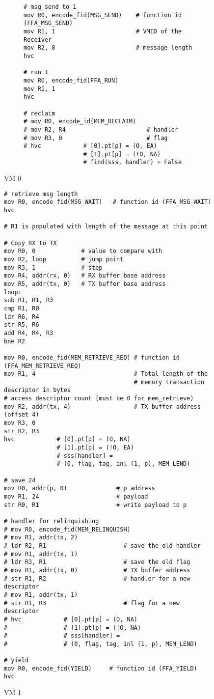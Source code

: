 \documentclass{book}
\begin{document}
\begin{figure}[hbt!]
\begin{subfigure}{.5\textwidth}
\begin{lstlisting}
# msg_send to 1
mov R0, encode_fid(MSG_SEND)    # function id (FFA_MSG_SEND)
mov R1, 1                       # VMID of the Receiver
mov R2, 8                       # message length
hvc

# run 1
mov R0, encode_fid(FFA_RUN)
mov R1, 1
hvc

# reclaim
# mov R0, encode_id(MEM_RECLAIM)
# mov R2, R4                       # handler
# mov R3, 0                        # flag
# hvc            # [0].pt[p] = (O, EA)
                 # [1].pt[p] = (!O, NA)
                 # find(sss, handler) = False       
\end{lstlisting}
\label{fig:sub2}
\end{subfigure}
\caption{VM 0}
\label{fig:test}
\end{figure}

\begin{figure}[hbt!]
\begin{lstlisting}
# retrieve msg length
mov R0, encode_fid(MSG_WAIT)   # function id (FFA_MSG_WAIT)
hvc

# R1 is populated with length of the message at this point

# Copy RX to TX
mov R0, 0             # value to compare with
mov R2, loop          # jump point
mov R3, 1             # step
mov R4, addr(rx, 0)   # RX buffer base address
mov R5, addr(tx, 0)   # TX buffer base address
loop:
sub R1, R1, R3
cmp R1, R0
ldr R6, R4
str R5, R6
add R4, R4, R3
bne R2

mov R0, encode_fid(MEM_RETRIEVE_REQ) # function id (FFA_MEM_RETRIEVE_REQ)
mov R1, 4                            # Total length of the  
                                     # memory transaction descriptor in bytes
# access descriptor count (must be 0 for mem_retrieve)
mov R2, addr(tx, 4)                  # TX buffer address (offset 4)
mov R3, 0
str R2, R3                                    
hvc            # [0].pt[p] = (O, NA)
               # [1].pt[p] = (!O, EA)
               # sss[handler] = 
               # (0, flag, tag, inl (1, p), MEM_LEND)

# save 24
mov R0, addr(p, 0)              # p address
mov R1, 24                      # payload
str R0, R1                      # write payload to p

# handler for relinquishing
# mov R0, encode_fid(MEM_RELINQUISH)
# mov R1, addr(tx, 2)
# ldr R2, R1                      # save the old handler
# mov R1, addr(tx, 1)
# ldr R3, R1                      # save the old flag
# mov R1, addr(tx, 0)             # TX buffer address
# str R1, R2                      # handler for a new descriptor
# mov R1, addr(tx, 1)
# str R1, R3                      # flag for a new descriptor
# hvc            # [0].pt[p] = (O, NA)
#                # [1].pt[p] = (!O, NA)
#                # sss[handler] = 
#                # (0, flag, tag, inl (1, p), MEM_LEND)

# yield
mov R0, encode_fid(YIELD)     # function id (FFA_YIELD)
hvc
\end{lstlisting}
\caption{VM 1}
\end{figure}
\end{document}
